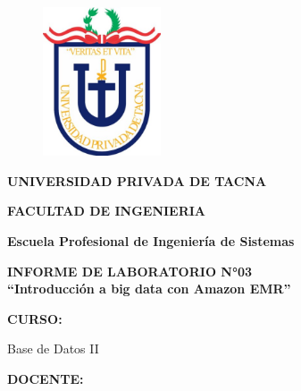 \documentclass[12pt,letterpaper]{article}
\begin{document}
	\begin{titlepage}
		\begin{center}
			\begin{figure}[htb]
				\begin{center}
					\includegraphics[width=3.5cm]{./img/upt}
				\end{center}
			\end{figure}
			\vspace*{0.15in}
			\begin{Large}
				\textbf{UNIVERSIDAD PRIVADA DE TACNA}\\
			\end{Large}
			\vspace*{0.15in}
			\begin{Large}
				\textbf{FACULTAD DE INGENIERIA} \\
			\end{Large}
			\vspace*{0.1in}
			\begin{Large}
				\textbf{Escuela Profesional de Ingeniería de Sistemas} \\
			\end{Large}
			\vspace*{0.3in}
			\begin{Large}
				\textbf{INFORME DE LABORATORIO N°03}\\
				\textbf{“Introducción a big data con Amazon EMR”}\\
			\end{Large}
			\vspace*{0.2in}
			\begin{Large}
				\textbf{CURSO:} \\
			\end{Large}
			\vspace*{0.1in}
			\begin{large}
				Base de Datos II\\
			\end{large}
			\vspace*{0.2in}
			\begin{Large}
				\textbf{DOCENTE:} \\

\end{Large}
\end{center}
\end{titlepage}
\end{document}
